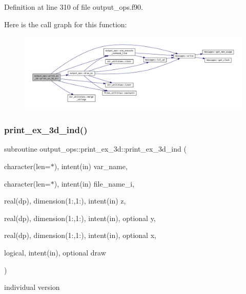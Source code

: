 Definition at line 310 of file output\+\_\+ops.\+f90.

Here is the call graph for this function\+:\nopagebreak
\begin{figure}[H]
\begin{center}
\leavevmode
\includegraphics[width=350pt]{interfaceoutput__ops_1_1print__ex__3d_af4a49d03579403f42201d7ce503fa465_cgraph}
\end{center}
\end{figure}
\mbox{\label{interfaceoutput__ops_1_1print__ex__3d_aa1665ffffbfabae84fc372d5f138456b}} 
\subsubsection{\texorpdfstring{print\+\_\+ex\+\_\+3d\+\_\+ind()}{print\_ex\_3d\_ind()}}
{\footnotesize\ttfamily subroutine output\+\_\+ops\+::print\+\_\+ex\+\_\+3d\+::print\+\_\+ex\+\_\+3d\+\_\+ind (\begin{DoxyParamCaption}\item[{character(len=$\ast$), intent(in)}]{var\+\_\+name,  }\item[{character(len=$\ast$), intent(in)}]{file\+\_\+name\+\_\+i,  }\item[{real(dp), dimension(1\+:,1\+:), intent(in)}]{z,  }\item[{real(dp), dimension(1\+:,1\+:), intent(in), optional}]{y,  }\item[{real(dp), dimension(1\+:,1\+:), intent(in), optional}]{x,  }\item[{logical, intent(in), optional}]{draw }\end{DoxyParamCaption})}



individual version 


